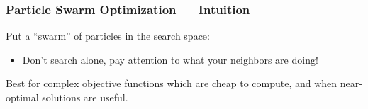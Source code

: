 \documentclass[xcolor=dvipsnames]{beamer}
\begin{document}
\begin{frame}
  \frametitle{Particle Swarm Optimization --- Intuition}
Put a ``swarm'' of particles in the search space:\\
\begin{itemize}
\item[] Don't search alone, pay attention to what your neighbors are doing!
\end{itemize}
\begin{center}
\end{center}
Best for {\color{red} complex} objective functions which are {\color{red} cheap} to compute, and when {\color{red} near-optimal} solutions are useful.
\end{frame}
\end{document}
